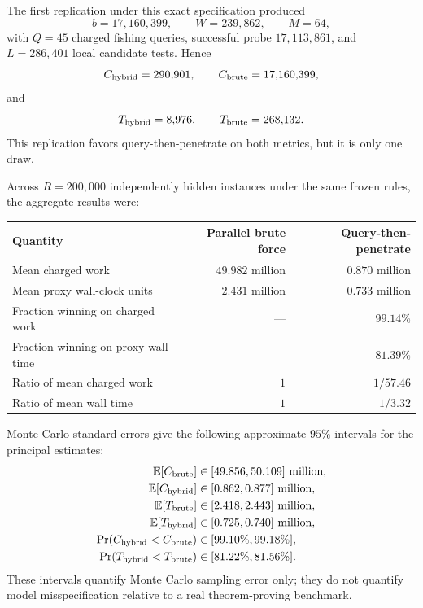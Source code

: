 \documentclass[11pt]{article}
\theoremstyle{definition}
\begin{document}
The first replication under this exact specification produced
\[
b=17{,}160{,}399,
\qquad
W=239{,}862,
\qquad
M=64,
\]
with $Q=45$ charged fishing queries, successful probe $17{,}113{,}861$, and $L=286{,}401$ local candidate tests. Hence
\[
C_{\rm hybrid}=290{,}901,
\qquad
C_{\rm brute}=17{,}160{,}399,
\]
and
\[
T_{\rm hybrid}=8{,}976,
\qquad
T_{\rm brute}=268{,}132.
\]
This replication favors query-then-penetrate on both metrics, but it is only one draw.

Across $R=200{,}000$ independently hidden instances under the same frozen rules, the aggregate results were:
\begin{center}
\begin{tabular}{@{}lrr@{}}
\toprule
Quantity & Parallel brute force & Query-then-penetrate \\
\midrule
Mean charged work & $49.982$ million & $0.870$ million \\
Mean proxy wall-clock units & $2.431$ million & $0.733$ million \\
Fraction winning on charged work & --- & $99.14\%$ \\
Fraction winning on proxy wall time & --- & $81.39\%$ \\
Ratio of mean charged work & $1$ & $1/57.46$ \\
Ratio of mean wall time & $1$ & $1/3.32$ \\
\bottomrule
\end{tabular}
\end{center}

Monte Carlo standard errors give the following approximate $95\%$ intervals for the principal estimates:
\[
\begin{aligned}
\mathbb E[C_{\rm brute}]&\in[49.856,50.109]\text{ million},\\
\mathbb E[C_{\rm hybrid}]&\in[0.862,0.877]\text{ million},\\
\mathbb E[T_{\rm brute}]&\in[2.418,2.443]\text{ million},\\
\mathbb E[T_{\rm hybrid}]&\in[0.725,0.740]\text{ million},\\
\Pr(C_{\rm hybrid}<C_{\rm brute})&\in[99.10\%,99.18\%],\\
\Pr(T_{\rm hybrid}<T_{\rm brute})&\in[81.22\%,81.56\%].
\end{aligned}
\]
These intervals quantify Monte Carlo sampling error only; they do not quantify model misspecification relative to a real theorem-proving benchmark.
\end{document}
